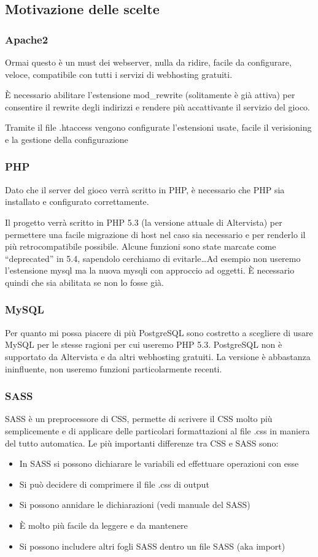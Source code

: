 \documentclass[10pt,a4paper]{article}
\begin{document}
\subsection{Motivazione delle scelte}
\subsubsection*{Apache2}
Ormai questo è un must dei webserver, nulla da ridire, facile da configurare, veloce, compatibile con tutti i servizi di webhosting gratuiti. 

È necessario abilitare l'estensione mod\_rewrite (solitamente è già attiva) per consentire il rewrite degli indirizzi e rendere più accattivante il servizio del gioco.

Tramite il file .htaccess vengono configurate l'estensioni usate, facile il verisioning e la gestione della configurazione

\subsubsection*{PHP}
Dato che il server del gioco verrà scritto in PHP, è necessario che PHP sia installato e configurato correttamente. 

Il progetto verrà scritto in PHP 5.3 (la versione attuale di Altervista) per permettere una facile migrazione di host nel caso sia necessario e per renderlo il più retrocompatibile possibile. Alcune funzioni sono state marcate come “deprecated” in 5.4, sapendolo cerchiamo di evitarle\dots Ad esempio non useremo l'estensione mysql ma la nuova mysqli con approccio ad oggetti. È necessario quindi che sia abilitata se non lo fosse già.

\subsubsection*{MySQL}
Per quanto mi possa piacere di più PostgreSQL sono costretto a scegliere di usare MySQL per le stesse ragioni per cui useremo PHP 5.3. PostgreSQL non è supportato da Altervista e da altri webhosting gratuiti. La versione è abbastanza ininfluente, non useremo funzioni particolarmente recenti.

\subsubsection*{SASS}
SASS è un preprocessore di CSS, permette di scrivere il CSS molto più semplicemente e di applicare delle particolari formattazioni al file .css in maniera del tutto automatica. Le più importanti differenze tra CSS e SASS sono:
\begin{itemize}
\item In SASS si possono dichiarare le variabili ed effettuare operazioni con esse
\item Si può decidere di comprimere il file .css di output 
\item Si possono annidare le dichiarazioni (vedi manuale del SASS)
\item È molto più facile da leggere e da mantenere
\item Si possono includere altri fogli SASS dentro un file SASS (aka import)
\end{itemize}
\end{document}

